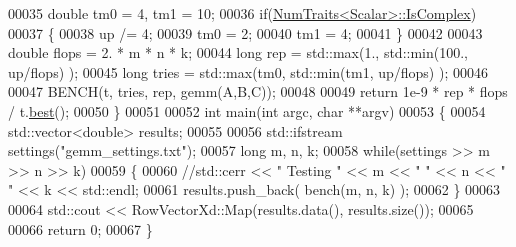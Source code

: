 \begin{DoxyCode}
00035   \textcolor{keywordtype}{double} tm0 = 4, tm1 = 10;
00036   \textcolor{keywordflow}{if}(\hyperlink{group___core___module_struct_eigen_1_1_num_traits}{NumTraits<Scalar>::IsComplex})
00037   \{
00038     up /= 4;
00039     tm0 = 2;
00040     tm1 = 4;
00041   \}
00042   
00043   \textcolor{keywordtype}{double} flops = 2. * m * n * k;
00044   \textcolor{keywordtype}{long} rep = std::max(1., std::min(100., up/flops) );
00045   \textcolor{keywordtype}{long} tries = std::max(tm0, std::min(tm1, up/flops) );
00046   
00047   BENCH(t, tries, rep, gemm(A,B,C));
00048   
00049   \textcolor{keywordflow}{return} 1e-9 * rep * flops / t.\hyperlink{class_eigen_1_1_bench_timer_ae8b673b0fa356d3432c7a65c79e8af0e}{best}();
00050 \}
00051 
00052 \textcolor{keywordtype}{int} main(\textcolor{keywordtype}{int} argc, \textcolor{keywordtype}{char} **argv)
00053 \{
00054   std::vector<double> results;
00055   
00056   std::ifstream settings(\textcolor{stringliteral}{"gemm\_settings.txt"});
00057   \textcolor{keywordtype}{long} m, n, k;
00058   \textcolor{keywordflow}{while}(settings >> m >> n >> k)
00059   \{
00060     \textcolor{comment}{//std::cerr << "  Testing " << m << " " << n << " " << k << std::endl;}
00061     results.push\_back( bench(m, n, k) );
00062   \}
00063   
00064   std::cout << RowVectorXd::Map(results.data(), results.size());
00065   
00066   \textcolor{keywordflow}{return} 0;
00067 \}
\end{DoxyCode}
